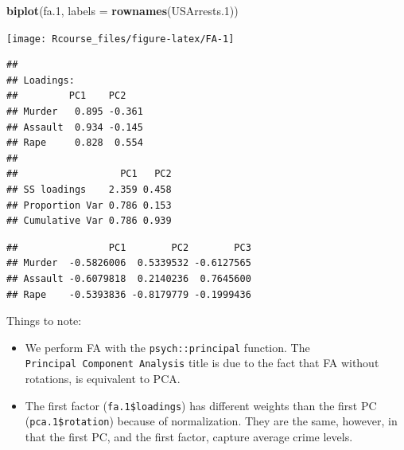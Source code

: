 \documentclass[]{book}
\newenvironment{Shaded}{\begin{snugshade}}{\end{snugshade}}
\newcommand{\KeywordTok}[1]{\textcolor[rgb]{0.13,0.29,0.53}{\textbf{#1}}}
\newcommand{\DataTypeTok}[1]{\textcolor[rgb]{0.13,0.29,0.53}{#1}}
\newcommand{\DecValTok}[1]{\textcolor[rgb]{0.00,0.00,0.81}{#1}}
\newcommand{\CommentTok}[1]{\textcolor[rgb]{0.56,0.35,0.01}{\textit{#1}}}
\newcommand{\OperatorTok}[1]{\textcolor[rgb]{0.81,0.36,0.00}{\textbf{#1}}}
\newcommand{\NormalTok}[1]{#1}
\providecommand{\tightlist}{%
  \setlength{\itemsep}{0pt}\setlength{\parskip}{0pt}}
\theoremstyle{definition}
\theoremstyle{definition}
\theoremstyle{definition}
\theoremstyle{remark}
\begin{document}
\begin{Shaded}
\begin{Highlighting}[]
\KeywordTok{biplot}\NormalTok{(fa.}\DecValTok{1}\NormalTok{, }\DataTypeTok{labels =}  \KeywordTok{rownames}\NormalTok{(USArrests.}\DecValTok{1}\NormalTok{)) }
\end{Highlighting}
\end{Shaded}

\texttt{[image: Rcourse\_files/figure-latex/FA-1]}

\begin{Shaded}
\end{Shaded}

\begin{verbatim}
## 
## Loadings:
##         PC1    PC2   
## Murder   0.895 -0.361
## Assault  0.934 -0.145
## Rape     0.828  0.554
## 
##                  PC1   PC2
## SS loadings    2.359 0.458
## Proportion Var 0.786 0.153
## Cumulative Var 0.786 0.939
\end{verbatim}

\begin{Shaded}
\end{Shaded}

\begin{verbatim}
##                PC1        PC2        PC3
## Murder  -0.5826006  0.5339532 -0.6127565
## Assault -0.6079818  0.2140236  0.7645600
## Rape    -0.5393836 -0.8179779 -0.1999436
\end{verbatim}

Things to note:

\begin{itemize}
\tightlist
\item
  We perform FA with the \texttt{psych::principal} function. The
  \texttt{Principal\ Component\ Analysis} title is due to the fact that
  FA without rotations, is equivalent to PCA.
\item
  The first factor (\texttt{fa.1\$loadings}) has different weights than
  the first PC (\texttt{pca.1\$rotation}) because of normalization. They
  are the same, however, in that the first PC, and the first factor,
  capture average crime levels.
\end{itemize}
\end{document}

